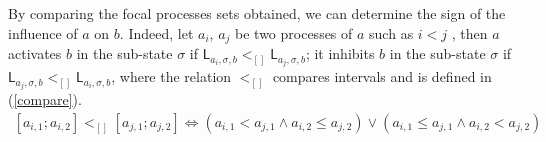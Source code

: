 By comparing the focal processes sets obtained, we can determine the sign of the influence of $a$ on $b$. Indeed, let $a_i$, $a_j$ be two processes of $a$ such as $i < j$ , then $a$ activates $b$ in the sub-state $\sigma$ if $\mathsf{L}_{a_i,\sigma,b} <_{[]} \mathsf{L}_{a_j,\sigma,b}$; it inhibits $b$ in the sub-state $\sigma$ if $\mathsf{L}_{a_j,\sigma,b} <_{[]} \mathsf{L}_{a_i,\sigma,b}$, where the relation $<_{[]}$ compares intervals and is defined in (\ref{compare}).
\begin{align}
\label{compare}
  [a_{i,1} ; a_{i,2}] <_{[]} [a_{j,1} ; a_{j,2}] \Leftrightarrow (a_{i,1} < a_{j,1} \wedge a_{i,2} \leq a_{j,2}) \vee (a_{i,1} \leq a_{j,1} \wedge a_{i,2} < a_{j,2})
\end{align}





